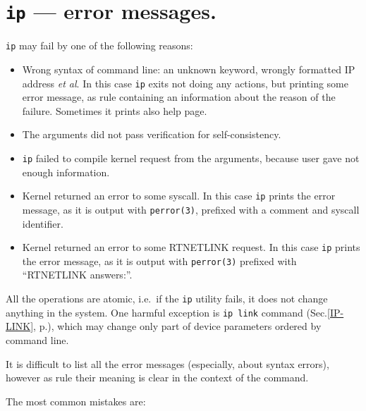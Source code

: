 \section{{\tt ip} --- error messages.}

\verb|ip| may fail by one of the following reasons:

\begin{itemize}
\item
Wrong syntax of command line: an unknown keyword, wrongly formatted
IP address {\em et al\/}. In this case \verb|ip| exits not doing any actions,
but printing some error message, as rule containing an information
about the reason of the failure. Sometimes it prints also help page.

\item
The arguments did not pass verification for self-consistency.

\item
\verb|ip| failed to compile kernel request from the arguments,
because user gave not enough information.

\item
Kernel returned an error to some syscall. In this case \verb|ip|
prints the error message, as it is output with \verb|perror(3)|,
prefixed with a comment and syscall identifier.

\item
Kernel returned an error to some RTNETLINK request.
In this case \verb|ip| prints the error message, as it is output
with \verb|perror(3)| prefixed with ``RTNETLINK answers:''.

\end{itemize}

All the operations are atomic, i.e.\ 
if the \verb|ip| utility fails, it does not change anything
in the system. One harmful exception is \verb|ip link| command
(Sec.\ref{IP-LINK}, p.\pageref{IP-LINK}),
which may change only part of device parameters ordered
by command line.

It is difficult to list all the error messages (especially,
about syntax errors), however as rule their meaning is clear
in the context of the command.

The most common mistakes are:

